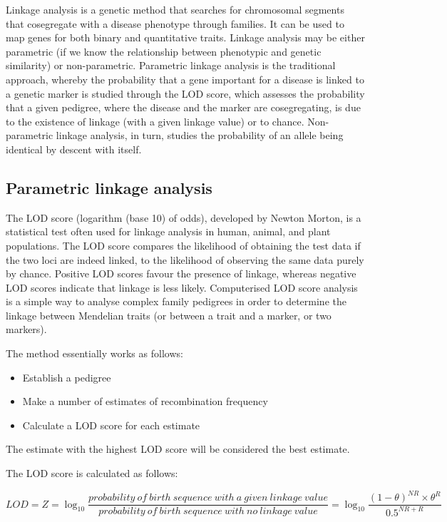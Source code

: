 Linkage analysis is a genetic method that searches for chromosomal segments that cosegregate with a disease phenotype through families. It can be used to map genes for both binary and quantitative traits. Linkage analysis may be either parametric (if we know the relationship between phenotypic and genetic similarity) or non-parametric. Parametric linkage analysis is the traditional approach, whereby the probability that a gene important for a disease is linked to a genetic marker is studied through the LOD score, which assesses the probability that a given pedigree, where the disease and the marker are cosegregating, is due to the existence of linkage (with a given linkage value) or to chance. Non-parametric linkage analysis, in turn, studies the probability of an allele being identical by descent with itself.

\hypertarget{parametric-linkage-analysis}{%
\subsection{Parametric linkage analysis}\label{parametric-linkage-analysis}}

The LOD score (logarithm (base 10) of odds), developed by Newton Morton, is a statistical test often used for linkage analysis in human, animal, and plant populations. The LOD score compares the likelihood of obtaining the test data if the two loci are indeed linked, to the likelihood of observing the same data purely by chance. Positive LOD scores favour the presence of linkage, whereas negative LOD scores indicate that linkage is less likely. Computerised LOD score analysis is a simple way to analyse complex family pedigrees in order to determine the linkage between Mendelian traits (or between a trait and a marker, or two markers).

The method essentially works as follows:

\begin{itemize}
\tightlist
\item
  Establish a pedigree
\item
  Make a number of estimates of recombination frequency
\item
  Calculate a LOD score for each estimate
\end{itemize}

The estimate with the highest LOD score will be considered the best estimate.

The LOD score is calculated as follows:

\[LOD = Z = \log_{10}\frac{probability\ of\ birth\ sequence\ with\ a\ given\ linkage\ value}{probability\ of\ birth\ sequence\ with\ no\ linkage\ value} = \log_{10}\frac{(1-\theta)^{NR} \times \theta^R}{0.5^{NR+R}}\]

